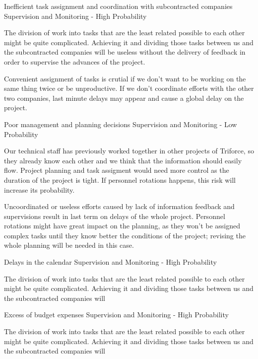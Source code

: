 \begin{risk}{Inefficient task assignment and coordination with subcontracted companies}
\riskcat Supervision and Monitoring
 - High Probability 

The division of work into tasks that are the least related possible to each other might be quite complicated. Achieving it and dividing those tasks between us and the subcontracted companies will be useless without the delivery of feedback in order to supervise the advances of the project.

Convenient assignment of tasks is crutial if we don't want to be working on the same thing twice or be unproductive. If we don't coordinate efforts with the other two companies, last minute delays may appear and cause a global delay on the project.
\end{risk}

\begin{risk}{Poor management and planning decisions}
\riskcat Supervision and Monitoring
 - Low Probability 

Our technical staff has previously worked together in other projects of Triforce, so they already know each other and we think that the information should easily flow. Project planning and task assigment would need more control as the duration of the project is tight. If personnel rotations happens, this risk will increase its probability.

Uncoordinated or useless efforts caused by lack of information feedback and supervisions result in last term on delays of the whole project. Personnel rotations might have great impact on the planning, as they won't be assigned complex tasks until they know better the conditions of the project; revising the whole planning will be needed in this case.
\end{risk}

\begin{risk}{Delays in the calendar}
\riskcat Supervision and Monitoring
 - High Probability 

The division of work into tasks that are the least related possible to each other might be quite complicated. Achieving it and dividing those tasks between us and the subcontracted companies will \end{risk}

\begin{risk}{Excess of budget expenses}
\riskcat Supervision and Monitoring
 - High Probability 

The division of work into tasks that are the least related possible to each other might be quite complicated. Achieving it and dividing those tasks between us and the subcontracted companies will 
\end{risk}


